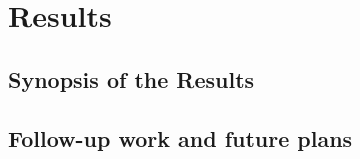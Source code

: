 \part{Results}
\label{part:results}

\chapter{Synopsis of the Results}

\chapter{Follow-up work and future plans}
